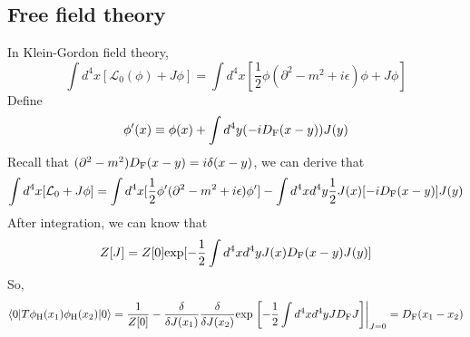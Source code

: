 \subsection{Free field theory}
\noindent
In Klein-Gordon field theory,
\[\int d^4x [\mathcal{L}_0(\phi)+J\phi] = \int d^4x [\frac{1}{2}\phi (\partial^2 -m^2+i\epsilon)\phi + J\phi]\]
Define
\[\phi'(x) \equiv \phi(x) + \int d^4y (-iD_{\rm F}(x-y)) J(y) \]
Recall that $(\partial^2-m^2)D_{\rm F}(x-y) = i\delta(x-y)$, we can derive that
\[\int d^4x [\mathcal{L}_0+J\phi] = \int d^4x [\frac{1}{2}\phi' (\partial^2 -m^2+i\epsilon)\phi'] - \int d^4x d^4y \frac{1}{2} J(x)[-iD_{\rm F}(x-y)]J(y)\]
After integration, we can know that
\[Z[J] = Z[0] \mathrm{exp} [-\frac{1}{2} \int d^4x d^4y J(x)D_{\rm F}(x-y)J(y)]\]
So,
\[\langle 0 | T \phi_{\rm H}(x_1) \phi_{\rm H}(x_2) | 0 \rangle =  \frac{1}{Z[0]}- \frac{\delta}{\delta J(x_1)} \frac{\delta}{\delta J(x_2)} \mathrm{exp} \left. \left[-\frac{1}{2} \int d^4x d^4y JD_{\rm F}J\right] \right |_{J=0} = D_{\rm F}(x_1-x_2)\]

